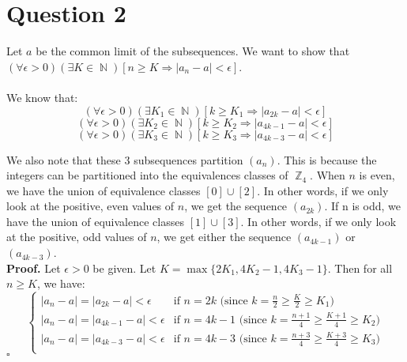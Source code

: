 \documentclass[a4paper,11pt]{article}
\renewenvironment{proof}{{\bfseries Proof.}}{\hfill $\square$}
\DeclareMathOperator{\N}{\mathbb{N}}
\DeclareMathOperator{\Z}{\mathbb{Z}}
\begin{document}
\section{Question 2}
Let $a$ be the common limit of the subsequences. We want to show that $(\forall \epsilon > 0)(\exists K \in \N)[n \geq K \Rightarrow |a_n-a| < \epsilon]$. \\\\
We know that:
$$(\forall \epsilon > 0)(\exists K_1 \in \N)[k \geq K_1 \Rightarrow |a_{2k}-a| < \epsilon]$$
$$(\forall \epsilon > 0)(\exists K_2 \in \N)[k \geq K_2 \Rightarrow |a_{4k-1}-a| < \epsilon]$$ 
$$(\forall \epsilon > 0)(\exists K_3 \in \N)[k \geq K_3 \Rightarrow |a_{4k-3}-a| < \epsilon]$$

We also note that these 3 subsequences partition $(a_n)$. This is because the integers can be partitioned into the equivalences classes of $\Z_4$. When $n$ is even, we have the union of equivalence classes $[0] \cup [2]$. In other words, if we only look at the positive, even values of $n$, we get the sequence $(a_{2k})$. If n is odd, we have the union of equivalence classes $[1] \cup [3]$. In other words, if we only look at the positive, odd values of $n$, we get either the sequence $(a_{4k-1})$ or $(a_{4k-3})$. \\

\begin{proof}
Let $\epsilon > 0$ be given. Let $K = \max\{2K_1, 4K_2-1, 4K_3-1\}$. Then for all $n \geq K$, we have:
\[ \begin{cases}
	|a_n-a| = |a_{2k}-a| < \epsilon & \text{if } n = 2k \text{	(since $k = \frac{n}{2} \geq \frac{K}{2} \geq K_1$)} \\
      	|a_n-a| = |a_{4k-1}-a| < \epsilon & \text{if } n = 4k-1 \text{	(since $k = \frac{n+1}{4} \geq \frac{K+1}{4} \geq K_2$)} \\
      	|a_n-a| = |a_{4k-3}-a| < \epsilon & \text{if } n = 4k-3 \text{	(since $k = \frac{n+3}{4} \geq \frac{K+3}{4} \geq K_3$)} \\
\end{cases} 
\]
\end{proof}
\end{document}
